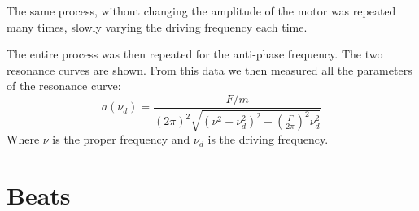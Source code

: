 \documentclass{article}
\begin{document}
The same process, without changing the amplitude of the motor was repeated many times, slowly varying the driving frequency each time. 

The entire process was then repeated for the anti-phase frequency. The two resonance curves are shown. 
From this data we then measured all the parameters of the resonance curve: 
\begin{equation}
    a (\nu_d) = \frac{F/m}{  (2\pi)^2
                \sqrt{( \nu^2 - \nu_d^2 )^2 +
                \left ( \frac{\Gamma}{2\pi} \right )^2 \nu_d^2}}
\end{equation}  
Where $\nu$ is the proper frequency and $\nu_d$ is the driving frequency.


\section{Beats}
\end{document}
